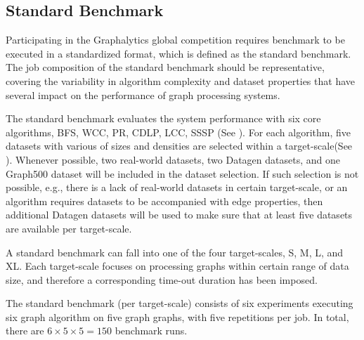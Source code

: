 \subsection{Standard Benchmark}
\label{sec:process:type:standard}
Participating in the Graphalytics global competition requires benchmark to be executed in a standardized format, which is defined as the standard benchmark. The job composition of the standard benchmark should be representative, covering the variability in algorithm complexity and dataset properties that have several impact on the performance of graph processing systems.

The standard benchmark evaluates the system performance with six core algorithms, BFS, WCC, PR, CDLP, LCC, SSSP (See ). For each algorithm, five datasets with various of sizes and densities are selected within a target-scale(See ). Whenever possible, two real-world datasets, two Datagen datasets, and one Graph500 dataset will be included in the dataset selection. If such selection is not possible, e.g., there is a lack of real-world datasets in certain target-scale, or an algorithm requires datasets to be accompanied with edge properties, then additional Datagen datasets will be used to make sure that at least five datasets are available per target-scale.

A standard benchmark can fall into one of the four target-scales, S, M, L, and XL. Each target-scale focuses on processing graphs within certain range of data size, and therefore a corresponding time-out duration has been imposed.  

The standard benchmark (per target-scale) consists of six experiments executing six graph algorithm on five graph graphs, with five repetitions per job. In total, there are $6 \times 5 \times 5 = 150$ benchmark runs.



